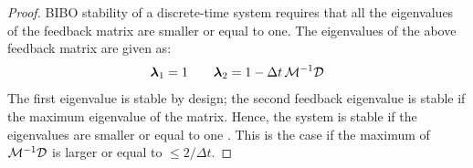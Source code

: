 \begin{proof}

BIBO stability of a discrete-time system requires that all the eigenvalues of the feedback matrix are smaller or equal to one.
The eigenvalues of the above feedback matrix are given as:
\begin{equation}
	\boldsymbol{\lambda}_1 = 1 \qquad \boldsymbol{\lambda}_2 = 1 - \Delta t \, \mathcal{M}^{-1} \mathcal{D}
\end{equation}
The first eigenvalue is stable by design; the second feedback eigenvalue is stable if the maximum eigenvalue of the matrix. 
Hence, the system is stable if the eigenvalues are smaller or equal to one \cite{friedland2012control}. This is the case if the maximum of $\mathcal{M}^{-1} \mathcal{D}$ is larger or equal to $\leq 2 / \Delta t$.
\end{proof}


